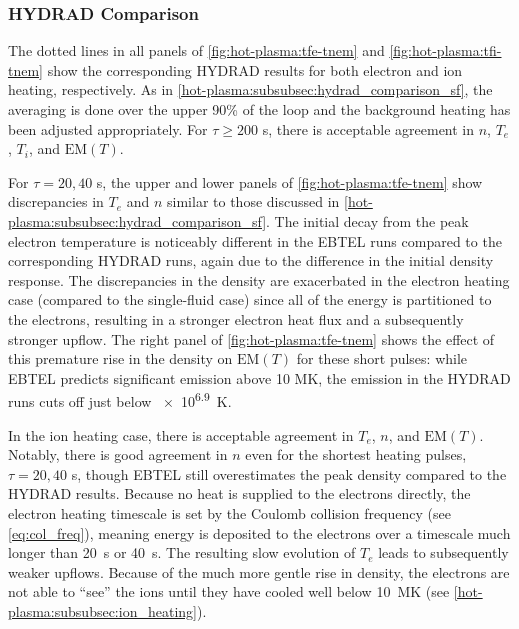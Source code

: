 \subsubsection{HYDRAD Comparison}\label{hot-plasma:subsubsec:hydrad_comparison_tf}

The dotted lines in all panels of \autoref{fig:hot-plasma:tfe-tnem} and \autoref{fig:hot-plasma:tfi-tnem} show the corresponding HYDRAD results for both electron and ion heating, respectively. As in \autoref{hot-plasma:subsubsec:hydrad_comparison_sf}, the averaging is done over the upper 90\% of the loop and the background heating has been adjusted appropriately. For $\tau\ge200$ s, there is acceptable agreement in $n$, $T_e$, $T_i$, and $\mathrm{EM}(T)$.

For $\tau=20,40$ s, the upper and lower panels of \autoref{fig:hot-plasma:tfe-tnem} show discrepancies in $T_e$ and $n$ similar to those discussed in \autoref{hot-plasma:subsubsec:hydrad_comparison_sf}. The initial decay from the peak electron temperature is noticeably different in the EBTEL runs compared to the corresponding HYDRAD runs, again due to the difference in the initial density response. The discrepancies in the density are exacerbated in the electron heating case (compared to the single-fluid case) since all of the energy is partitioned to the electrons, resulting in a stronger electron heat flux and a subsequently stronger upflow. The right panel of \autoref{fig:hot-plasma:tfe-tnem} shows the effect of this premature rise in the density on $\mathrm{EM}(T)$ for these short pulses: while EBTEL predicts significant emission above 10 MK, the emission in the HYDRAD runs cuts off just below \SI{e6.9}{\kelvin}.

In the ion heating case, there is acceptable agreement in $T_e$, $n$, and $\mathrm{EM}(T)$. Notably, there is good agreement in $n$ even for the shortest heating pulses, $\tau=20,40$ s, though EBTEL still overestimates the peak density compared to the HYDRAD results.  Because no heat is supplied to the electrons directly, the electron heating timescale is set by the Coulomb collision frequency (see \autoref{eq:col_freq}), meaning energy is deposited to the electrons over a timescale much longer than \SI{20}{\second} or \SI{40}{\second}. The resulting slow evolution of $T_e$ leads to subsequently weaker upflows. Because of the much more gentle rise in density, the electrons are not able to ``see'' the ions until they have cooled well below \SI{10}{\mega\kelvin} (see \autoref{hot-plasma:subsubsec:ion_heating}).

